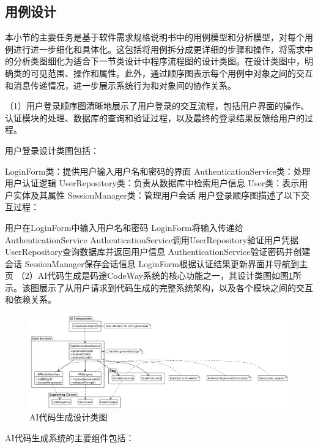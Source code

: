 \documentclass[
    report,     %
    oneside,    %
    UTF8,       %
    zihao=-4    %
]{config} %
\begin{document}
\subsection{用例设计}

本小节的主要任务是基于软件需求规格说明书中的用例模型和分析模型，对每个用例进行进一步细化和具体化。这包括将用例拆分成更详细的步骤和操作，将需求中的分析类图细化为适合下一节类设计中程序流程图的设计类图。在设计类图中，明确类的可见范围、操作和属性。此外，通过顺序图表示每个用例中对象之间的交互和消息传递情况，进一步展示系统行为和对象间的协作关系。

（1）用户登录顺序图清晰地展示了用户登录的交互流程，包括用户界面的操作、认证模块的处理、数据库的查询和验证过程，以及最终的登录结果反馈给用户的过程。

用户登录设计类图包括：

LoginForm类：提供用户输入用户名和密码的界面
AuthenticationService类：处理用户认证逻辑
UserRepository类：负责从数据库中检索用户信息
User类：表示用户实体及其属性
SessionManager类：管理用户会话
用户登录顺序图描述了以下交互过程：

用户在LoginForm中输入用户名和密码
LoginForm将输入传递给AuthenticationService
AuthenticationService调用UserRepository验证用户凭据
UserRepository查询数据库并返回用户信息
AuthenticationService验证密码并创建会话
SessionManager保存会话信息
LoginForm根据认证结果更新界面并导航到主页
（2）AI代码生成是码途CodeWay系统的核心功能之一，其设计类图如图\ref{fig:ai-codegen-class}所示。该图展示了从用户请求到代码生成的完整系统架构，以及各个模块之间的交互和依赖关系。

\begin{figure}[H]
    \centering
    \includegraphics[width=1.0\textwidth]{UML/AICodeGenClass.png}
    \caption{AI代码生成设计类图}
    \label{fig:ai-codegen-class}
\end{figure}

AI代码生成系统的主要组件包括：
\end{document}
